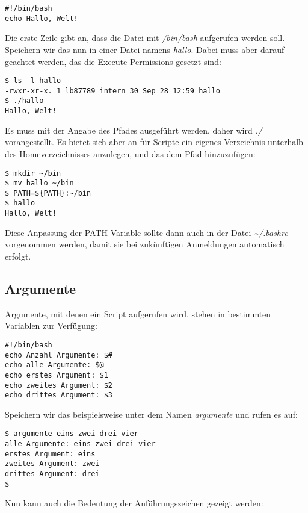 \documentclass[titlepage,a4paper]{article}
\begin{document}
\begin{verbatim}
#!/bin/bash
echo Hallo, Welt!
\end{verbatim}

Die erste Zeile gibt an, dass die Datei mit \emph{/bin/bash} aufgerufen werden soll.
Speichern wir das nun in einer Datei namens \emph{hallo}.
Dabei muss aber darauf geachtet werden, das die Execute Permissions gesetzt sind:

\begin{verbatim}
$ ls -l hallo 
-rwxr-xr-x. 1 lb87789 intern 30 Sep 28 12:59 hallo
$ ./hallo 
Hallo, Welt!
\end{verbatim}

Es muss mit der Angabe des Pfades ausgeführt werden, daher wird \emph{./} vorangestellt.
Es bietet sich aber an für Scripte ein eigenes Verzeichnis unterhalb des Homeverzeichnisses
anzulegen, und das dem Pfad hinzuzufügen:

\begin{verbatim}
$ mkdir ~/bin
$ mv hallo ~/bin
$ PATH=${PATH}:~/bin
$ hallo
Hallo, Welt!
\end{verbatim}

Diese Anpassung der PATH-Variable sollte dann auch in der Datei \emph{\textasciitilde/.bashrc} vorgenommen werden,
damit sie bei zukünftigen Anmeldungen automatisch erfolgt.

\subsection{Argumente}

\noindent
Argumente, mit denen ein Script aufgerufen wird, stehen in bestimmten Variablen zur Verfügung:

\begin{verbatim}
#!/bin/bash
echo Anzahl Argumente: $#
echo alle Argumente: $@
echo erstes Argument: $1
echo zweites Argument: $2
echo drittes Argument: $3
\end{verbatim}

\noindent
Speichern wir das beispielsweise unter dem Namen \emph{argumente} und rufen es auf:

\begin{verbatim}
$ argumente eins zwei drei vier
alle Argumente: eins zwei drei vier
erstes Argument: eins
zweites Argument: zwei
drittes Argument: drei
$ _
\end{verbatim}

\noindent
Nun kann auch die Bedeutung der Anführungszeichen gezeigt werden:
\end{document}
